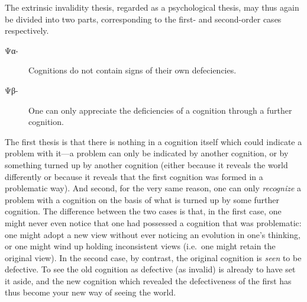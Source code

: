 \documentclass[11pt,letterpaper,oneside]{amsart}
\newcommand{\g}{\textgreek}
\newcommand{\e}{\emph}
\newcommand{\svapra}{\e{svata\d{h} pr\={a}m\={a}\d{n}ya}}
\begin{document}
The extrinsic invalidity thesis, regarded as a psychological thesis, may thus again be divided into two parts, corresponding to the first- and second-order cases respectively.\begin{description}
\item[\g{Ψα-}] Cognitions do not contain signs of their own defeciencies.
\item[\g{Ψβ-}] One can only appreciate the deficiencies of a cognition through a further cognition.\end{description} The first thesis is that there is nothing in a cognition itself which could indicate a problem with it---a problem can only be indicated by another cognition, or by something turned up by another cognition (either because it reveals the world differently or because it reveals that the first cognition was formed in a problematic way). And second, for the very same reason, one can only \emph{recognize} a problem with a cognition on the basis of what is turned up by some further cognition. The difference between the two cases is that, in the first case, one might never even notice that one had possessed a cognition that was problematic: one might adopt a new view without ever noticing an evolution in one's thinking, or one might wind up holding inconsistent views (i.e.\ one might retain the original view). In the second case, by contrast, the original cognition is \e{seen} to be defective. To see the old cognition as defective (as invalid) is already to have set it aside, and the new cognition which revealed the defectiveness of the first has thus become your new way of seeing the world. 













\end{document}
